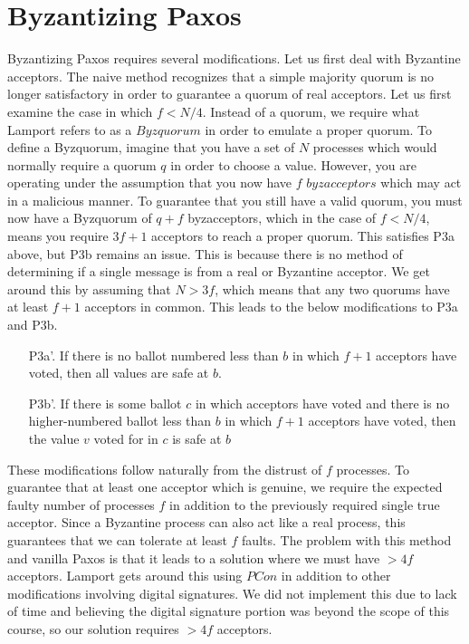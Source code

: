 \documentclass[conference]{IEEEtran}
\begin{document}
\section{Byzantizing Paxos}
Byzantizing Paxos requires several modifications. Let us first deal with Byzantine acceptors.
The naive method recognizes that a simple majority quorum is no longer satisfactory in order to guarantee a quorum of real acceptors. Let us first examine the case in which $f < N/4$. Instead of a quorum, we require what Lamport refers to as a $Byzquorum$ in order to emulate a proper quorum. To define a Byzquorum, imagine that you have a set of $N$ processes which would normally require a quorum $q$ in order to choose a value. However, you are operating under the assumption that you now have $f$ $byzacceptors$ which may act in a malicious manner. To guarantee that you still have a valid quorum, you must now have a Byzquorum of $q + f$ byzacceptors, which in the case of $f < N/4$, means you require $3f + 1$ acceptors to reach a proper quorum.
This satisfies P3a above, but P3b remains an issue. This is because there is no method of determining if a single message is from a real or Byzantine acceptor. We get around this by assuming that $N > 3f$, which means that any two quorums have at least $f + 1$ acceptors in common. This leads to the below modifications to P3a and P3b.
\smallskip
\begin{enumerate}[leftmargin=4em]
\item[P3a'.] If there is no ballot numbered less than $b$ in which $f + 1$ acceptors have voted, then all values are safe at $b$.
\item[P3b'.] If there is some ballot $c$ in which acceptors have voted and there is no higher-numbered ballot less than $b$ in which $f + 1$ acceptors have voted, then the value $v$ voted for in $c$ is safe at $b$
\end{enumerate}
\smallskip

These modifications follow naturally from the distrust of $f$ processes. To guarantee that at least one acceptor which is genuine, we require the expected faulty number of processes $f$ in addition to the previously required single true acceptor. Since a Byzantine process can also act like a real process, this guarantees that we can tolerate at least $f$ faults. The problem with this method and vanilla Paxos is that it leads to a solution where we must have $>4f$ acceptors. Lamport gets around this using $PCon$ in addition to other modifications involving digital signatures. We did not implement this due to lack of time and believing the digital signature portion was beyond the scope of this course, so our solution requires $> 4f$ acceptors.
\end{document}
